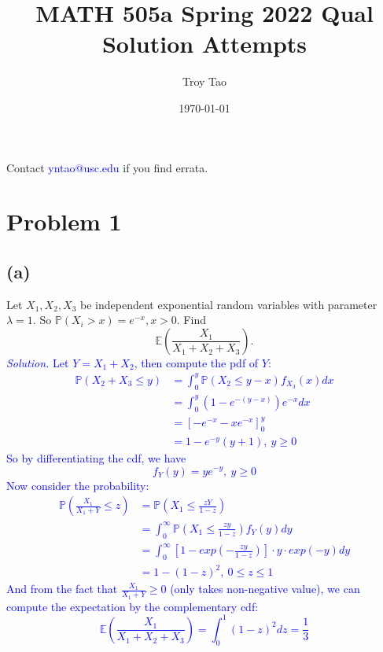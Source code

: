 \documentclass{article}
\title{MATH 505a Spring 2022 Qual Solution Attempts}
\author{Troy Tao}
\date\today
\begin{document}
\maketitle 
Contact \textcolor{blue}{yntao@usc.edu} if you find errata.

\section*{Problem 1}
\subsection*{(a)}
Let $X_1,X_2,X_3$ be independent exponential random variables with parameter $\lambda=1$. So $\mathbb{P}(X_i>x)=e^{-x},x>0$. Find
$$
    \mathbb{E}\left(\frac{X_1}{X_1+X_2+X_3}\right).
$$
\textcolor{blue}{
    \textit{Solution.} Let $Y = X_1+X_2$, then compute the pdf of $Y$: 
    \begin{equation*}
        \begin{split}
            \mathbb{P}(X_2+X_3\leq y) &=\int_0^y\mathbb{P}(X_2 \leq y-x)f_{X_3}(x)dx\\
            & = \int_0^y (1-e^{-(y-x)})e^{-x}dx\\
            & = \left[-e^{-x}-xe^{-x}\right]_0^y\\
            & = 1-e^{-y}(y+1), \ y \geq 0
        \end{split}
    \end{equation*}
    So by differentiating the cdf, we have
    \begin{equation*}
        f_Y(y) = ye^{-y}, \  y \geq 0
    \end{equation*}
    Now consider the probability:
    \begin{equation*}
        \begin{split}
            \mathbb{P}\left(\frac{X_1}{X_1+Y} \leq z\right) &= \mathbb{P}\left(X_1 \leq \frac{zY}{1-z}\right)\\
                &=\int_0^{\infty}\mathbb{P}\left(X_1 \leq \frac{zy}{1-z}\right)f_Y(y)dy\\
                &=\int_0^{\infty}\left[1-exp\left(-\frac{zy}{1-z}\right)\right]\cdot y \cdot exp(-y)dy\\
                &=1-(1-z)^2, \ 0\leq z \leq 1
        \end{split}
    \end{equation*}
    And from the fact that {\large$\frac{X_1}{X_1+Y}\geq 0$} (only takes non-negative value), we can compute the expectation by the complementary cdf:
    \begin{equation*}
        \mathbb{E}\left(\frac{X_1}{X_1+X_2+X_3}\right)=\int_0^1(1-z)^2dz = \frac{1}{3} 
    \end{equation*}
}
\end{document}
